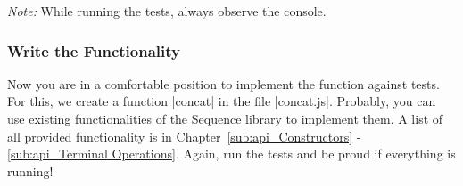 \textit{Note:} While running the tests, always observe the console.

\subsubsection{Write the Functionality}
\label{subsub:Write the Functionality}
Now you are in a comfortable position to implement the function against tests.
For this, we create a function |concat| in the file |concat.js|.
Probably, you can use existing functionalities of the Sequence library to implement them. A list of all
provided functionality is in Chapter~\ref{sub:api_Constructors} - \ref{sub:api_Terminal Operations}.
\newline
Again, run the tests and be proud if everything is running!
